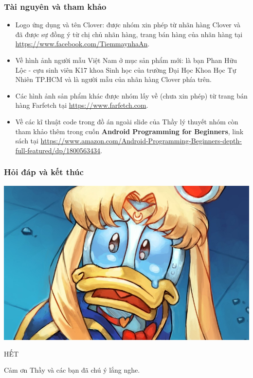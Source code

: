 \documentclass{beamer}
\begin{document}
\begin{frame}
    \frametitle{Tài nguyên và tham khảo}
    \begin{itemize}
        \item Logo ứng dụng và tên Clover: được nhóm xin phép từ nhãn hàng Clover và đã được sự đồng ý từ chị chủ nhãn hàng, trang bán hàng của nhãn hàng tại \href{https://www.facebook.com/TiemmaynhaAn}{\color{blue} https://www.facebook.com/TiemmaynhaAn}.
        \item Về hình ảnh người mẫu Việt Nam ở mục sản phẩm mới: là bạn Phan Hữu Lộc - cựu sinh viên K17 khoa Sinh học của trường Đại Học Khoa Học Tự Nhiên TP.HCM và là người mẫu của nhãn hàng Clover phía trên.
        \item Các hình ảnh sản phẩm khác được nhóm lấy về (chưa xin phép) từ trang bán hàng Farfetch tại \href{https://www.farfetch.com}{\color{blue} https://www.farfetch.com}.
        \item Về các kĩ thuật code trong đồ án ngoài slide của Thầy lý thuyết nhóm còn tham khảo thêm trong cuốn \textbf{\color{teal} Android Programming for Beginners}, link sách tại \href{https://www.amazon.com/Android-Programming-Beginners-depth-full-featured/dp/1800563434}{\color{blue} https://www.amazon.com/Android-Programming-Beginners-depth-full-featured/dp/1800563434}.
    \end{itemize}
\end{frame}

\begin{frame}
    \frametitle{Hỏi đáp và kết thúc}
    \includegraphics[width=\textwidth]{images/ask_and_answer.jpg}
\end{frame}

\begin{frame}
    \Huge{\centerline{HẾT}}
    \Large{\centerline{Cảm ơn Thầy và các bạn đã chú ý lắng nghe.}}
\end{frame}

\end{document}
